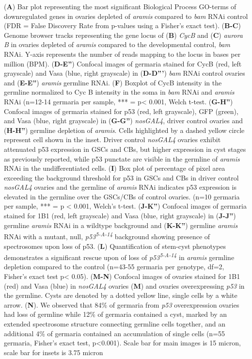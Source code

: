 \documentclass[12pt,oneside]{reedthesis}
\begin{document}
\setlength\parindent{0pt}(\textbf{A}) Bar plot representing the most significant Biological Process GO-terms of downregulated genes in ovaries depleted of \emph{aramis} compared to \emph{bam} RNAi control (FDR = False Discovery Rate from p-values using a Fisher's exact test). (\textbf{B-C}) Genome browser tracks representing the gene locus of (\textbf{B}) \emph{CycB} and (\textbf{C}) \emph{aurora B} in ovaries depleted of \emph{aramis} compared to the developmental control, \emph{bam} RNAi. Y-axis represents the number of reads mapping to the locus in bases per million (BPM). (\textbf{D-E''}) Confocal images of germaria stained for CycB (red, left grayscale) and Vasa (blue, right grayscale) in (\textbf{D-D'''}) \emph{bam} RNAi control ovaries and (\textbf{E-E''}) \emph{aramis} germline RNAi. (\textbf{F}) Boxplot of CycB intensity in the germline normalized to Cyc B intensity in the soma in \emph{bam} RNAi and \emph{aramis} RNAi (n=12-14 germaria per sample, *** = p\textless{} 0.001, Welch t-test. (\textbf{G-H''}) Confocal images of germaria stained for p53 (red, left grayscale), GFP (green), and Vasa (blue, right grayscale) in (\textbf{G-G''}) \emph{nosGAL4}, driver control ovaries and (\textbf{H-H''}) germline depletion of \emph{aramis}. Cells highlighted by a dashed yellow circle represent cell shown in the inset. Driver control \emph{nosGAL4} ovaries exhibit attenuated p53 expression in GSCs and CBs, but higher expression in cyst stages as previously reported, while p53 punctate are visible in the germline of \emph{aramis} RNAi in the undifferentiated cells. (\textbf{I}) Box plot of percentage of pixel area exceeding the background threshold for p53 in GSCs and CBs in driver control \emph{nosGAL4} ovaries and the germline of \emph{aramis} RNAi indicates p53 expression is elevated in the germline over the GSCs/CBs of control ovaries. (n=10 germaria per sample, *** = p \textless{} 0.001, Welch's t-test. (\textbf{J-K''}) Confocal images of germaria stained for 1B1 (red, left grayscale) and Vasa (blue, right grayscale) in (\textbf{J-J''}) germline \emph{aramis} RNAi in a wildtype background and (\textbf{K-K''}) germline \emph{aramis} RNAi with a mutant, null, \emph{p53\textsuperscript{5-A-14}} background showing presence of spectrosomes upon loss of p53. (\textbf{L}) Quantification of stem-cyst phenotypes demonstrates a significant rescue upon of loss of \emph{p53\textsuperscript{5-A-14}} in \emph{aramis} germline depletion compared to the control (n=43-55 germaria per genotype, df=2, Fisher's exact test p\textless{} 0.05). (\textbf{M-N}) Confocal images of ovaries stained for 1B1 (red) and Vasa (blue) in \emph{nosGAL4} ovaries (\textbf{M}) and ovaries overexpressing \emph{p53} in the germline. Cysts are denoted by a dotted yellow line, single cells by a white arrow. (\textbf{N}). We observed that 84\% of germaria from \emph{p53} overexpression ovaries had loss of germline while 12\% of germaria contained a cyst, marked by an extended spectrosome structure connecting germline cells together, and an additional 4\% of germaria contained an accumulation of single cells (n=55 germaria, Fisher's exact test, p\textless0.001). Scale bar for main images is 15 micron, scale bar for insets is 3.75 micron
\end{document}
